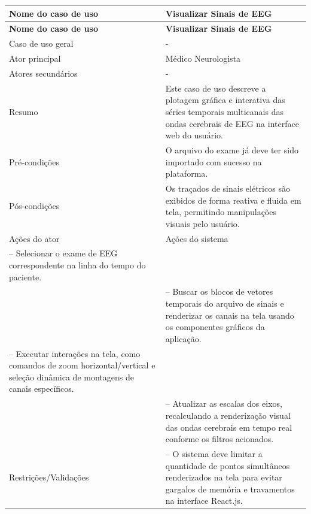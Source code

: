 \FloatBarrier{}
\nopagebreak[4]
\begingroup
\fontsize{10}{12}\selectfont
\setlength{\tabcolsep}{3pt}
\renewcommand{\arraystretch}{1.15}
\addtocounter{table}{-1}
\begin{longtable}{|>{\raggedright\arraybackslash}p{}|>{\raggedright\arraybackslash}p{}|}
\hline
\textbf{Nome do caso de uso} & \textbf{Visualizar Sinais de EEG} \\ \hline
\endfirsthead
\hline
\textbf{Nome do caso de uso} & \textbf{Visualizar Sinais de EEG} \\ \hline
\endhead
Caso de uso geral & - \\ \hline
Ator principal & Médico Neurologista \\ \hline
Atores secundários & - \\ \hline
Resumo & Este caso de uso descreve a plotagem gráfica e interativa das séries temporais multicanais das ondas cerebrais de EEG na interface web do usuário. \\ \hline
Pré-condições & O arquivo do exame já deve ter sido importado com sucesso na plataforma. \\ \hline
Pós-condições & Os traçados de sinais elétricos são exibidos de forma reativa e fluida em tela, permitindo manipulações visuais pelo usuário. \\ \hline
Ações do ator & Ações do sistema \\ \hline
1 – Selecionar o exame de EEG correspondente na linha do tempo do paciente. &  \\ \hline
 & 2 – Buscar os blocos de vetores temporais do arquivo de sinais e renderizar os canais na tela usando os componentes gráficos da aplicação. \\ \hline
3 – Executar interações na tela, como comandos de zoom horizontal/vertical e seleção dinâmica de montagens de canais específicos. &  \\ \hline
 & 4 – Atualizar as escalas dos eixos, recalculando a renderização visual das ondas cerebrais em tempo real conforme os filtros acionados. \\ \hline
Restrições/Validações & 1 – O sistema deve limitar a quantidade de pontos simultâneos renderizados na tela para evitar gargalos de memória e travamentos na interface React.js. \\ \hline
\end{longtable}
\endgroup
{}
